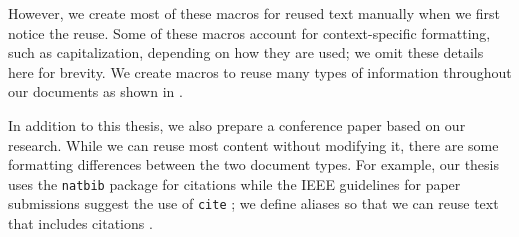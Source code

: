However, we create most of these macros for reused text manually when we first
notice the reuse. Some of these macros account for context-specific formatting,
such as capitalization, depending on how they are used; we omit these details
here for brevity. We create macros to reuse many types of information
throughout our documents as shown in .



\label{paper-macros}
In addition to this thesis, we also prepare a conference paper based on our
research. While we can reuse most content without modifying it, there are some
formatting differences between the two document types. For example, our thesis
uses the \texttt{natbib} package for citations while the IEEE guidelines for
paper submissions suggest the use of \texttt{cite} \citep[p.~8]{Shell2015};
we define aliases so that we can reuse text that includes citations
.

